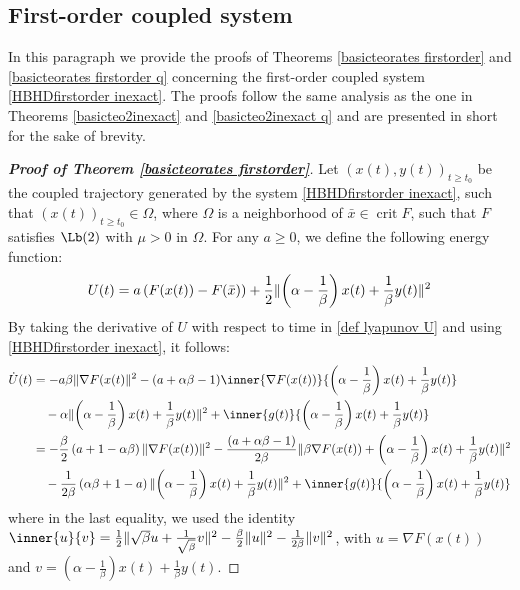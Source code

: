 \documentclass[reqno]{amsart}
\theoremstyle{plain}
\theoremstyle{definition}
\theoremstyle{remark}
\DeclareMathOperator{\crit}{crit}	%
\DeclarePairedDelimiter{\norm}{\lVert}{\rVert}	%
\begin{document}
\subsection{First-order coupled system}
In this paragraph we provide the proofs of Theorems \ref{basicteorates firstorder} and \ref{basicteorates firstorder q} concerning the first-order coupled system \eqref{HBHDfirstorder inexact}. The proofs follow the same analysis as the one in Theorems \ref{basicteo2inexact} and \ref{basicteo2inexact q} and are presented in short for the sake of brevity.

\begin{proof}[\textbf{Proof of Theorem \ref{basicteorates firstorder}}]
Let $\left(x(t),y(t)\right)_{t\geq t_{0}}$ be  the coupled trajectory generated by the system \eqref{HBHDfirstorder inexact}, such that $(x(t))_{t\geq t_{0}}\in \Omega$, where $\Omega$ is a neighborhood of $\bar{x}\in \crit{F}$, such that $F$ satisfies \hyperref[PL]{$\Lb(2)$} with $\mu>0$ in $\Omega$. 
For any $a\geq0$, we define the following energy function:
\begin{equation}\label{def lyapunov U}
	U(t)=a\left(F(x(t))-F(\bar{x})\right) + \frac{1}{2}\norm{\left(\alpha-\frac{1}{\beta}\right)x(t) + \frac{1}{\beta}y(t)}^{2}
\end{equation}
By taking the derivative of $U$ with respect to time in \eqref{def lyapunov U} and using \eqref{HBHDfirstorder inexact}, it follows:
\begin{equation}\label{for the proof first order1}
	\begin{aligned}
		\dot{U}(t)
		& = - a\beta\norm{\nabla F(x(t)}^{2} -(a+\alpha\beta-1)\inner{\nabla F(x(t))}{\left(\alpha-\frac{1}{\beta}\right)x(t) + \frac{1}{\beta}y(t)} \\
		& \quad - \alpha\norm{\left(\alpha-\frac{1}{\beta}\right)x(t) + \frac{1}{\beta}y(t)}^{2} + \inner{g(t)}{\left(\alpha-\frac{1}{\beta}\right)x(t) + \frac{1}{\beta}y(t)} \\
		& = -\frac{\beta}{2}\left(a+1-\alpha\beta\right)\norm{\nabla F(x(t))}^{2} -\frac{\left(a+\alpha\beta-1\right)}{2\beta}\norm{\beta\nabla F(x(t)) + \left(\alpha-\frac{1}{\beta}\right)x(t) + \frac{1}{\beta}y(t)}^{2}  \\
		& \quad  - \frac{1}{2\beta}\left(\alpha\beta+1-a\right)\norm{\left(\alpha-\frac{1}{\beta}\right)x(t) + \frac{1}{\beta}y(t)}^{2} + \inner{g(t)}{\left(\alpha-\frac{1}{\beta}\right)x(t) + \frac{1}{\beta}y(t)}
	\end{aligned} 
\end{equation}
where in the last equality, we used the identity $\inner{u}{v} = \frac{1}{2}\norm{\sqrt{\beta}u+\frac{1}{\sqrt{\beta}}v}^{2} - \frac{\beta}{2}\norm{u}^{2}-\frac{1}{2\beta}\norm{v}^{2}$, with $u =\nabla F(x(t))$ and $v=\left(\alpha-\frac{1}{\beta}\right)x(t) + \frac{1}{\beta}y(t)$.
	

\end{proof}
\end{document}
